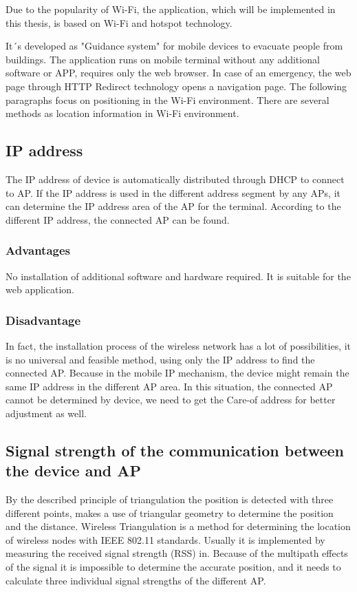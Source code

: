 Due to the popularity of Wi-Fi, the application, which will be implemented in this thesis, is based on Wi-Fi and hotspot technology.  

It´s developed as "Guidance system" for mobile devices to evacuate people from buildings. The application runs on mobile terminal without any additional software or APP, requires only the web browser. In case of an emergency, the web page through HTTP Redirect technology opens a navigation page. The following paragraphs focus on positioning in the Wi-Fi environment. There are several methods as location information in Wi-Fi environment.


\subsection{IP address}  

The IP address of device is automatically distributed through DHCP to connect to AP. If the IP address\cite{PaulCastro2001} is used in the different address segment by any APs, it can determine the IP address area of the AP for the terminal. According to the different IP address, the connected AP can be found.   

\subsubsection{Advantages}

No installation of additional software and hardware required. It is suitable for the web application.    

\subsubsection{Disadvantage}

In fact, the installation process of the wireless network has a lot of possibilities, it is no universal and feasible method, using only the IP address to find the connected AP. Because in the mobile IP mechanism, the device might remain the same IP address in the different AP area. In this situation, the connected AP cannot be determined by device, we need to get the Care-of address for better adjustment as well.   

\subsection{Signal strength of the communication between the device and AP}

By the described principle of triangulation the position is detected with three different points, makes a use of triangular geometry to determine the position and the distance\cite{SmallJ2000}. Wireless Triangulation is a method for determining the location of wireless nodes with IEEE 802.11 standards. Usually it is implemented by measuring the received signal strength (RSS) in\cite{YenChengChen2003}. Because of the multipath effects of the signal it is impossible to determine the accurate position, and it needs to calculate three individual signal strengths of the different AP.     

